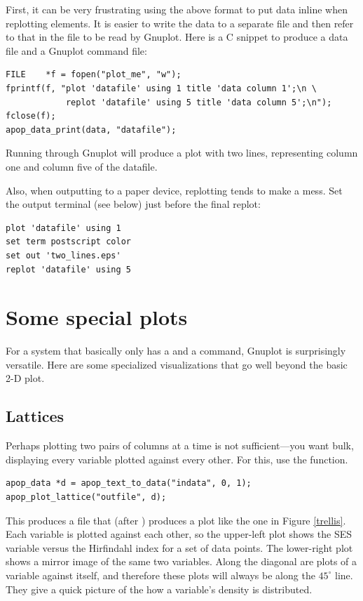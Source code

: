First, it can be very frustrating using the above  format
to put data inline when replotting elements. It is easier to write the
data to a separate file and then refer to that in the file to be read
by Gnuplot. Here is a C snippet to produce a data file and a Gnuplot
command file:
\begin{lstlisting}
FILE    *f = fopen("plot_me", "w");
fprintf(f, "plot 'datafile' using 1 title 'data column 1';\n \
            replot 'datafile' using 5 title 'data column 5';\n");
fclose(f);
apop_data_print(data, "datafile");
\end{lstlisting}
Running  through Gnuplot will produce a plot with two lines,
representing column one and column five of the datafile.

Also, when outputting to a paper device, replotting tends to make a
mess. Set the output terminal (see below) just before the final replot:
\begin{lstlisting}
plot 'datafile' using 1
set term postscript color
set out 'two_lines.eps'
replot 'datafile' using 5
\end{lstlisting}

\section{Some special plots} For a system that basically only has a 
\ci{set} and a \ci{plot} command, Gnuplot is surprisingly versatile. Here
are some specialized visualizations that go well beyond the basic 2-D
plot.

\subsection{Lattices}  
Perhaps plotting two pairs of columns at a time is not sufficient---you
want bulk, displaying every variable plotted against every other. For
this, use the \ci{apop\_plot\_lattice} function.

\begin{lstlisting}
apop_data *d = apop_text_to_data("indata", 0, 1);
apop_plot_lattice("outfile", d);
\end{lstlisting}
This produces a file that (after ) produces
a plot like the one in Figure \ref{trellis}. Each variable is plotted
against each other, so the upper-left plot shows the SES variable
versus the Hirfindahl index for a set of data points. The lower-right
plot shows a mirror image of the same two variables. Along the diagonal
are plots of a variable against itself, and therefore these plots will
always be along the $45^\circ$ line. They give a quick picture of the
how a variable's density is distributed.

